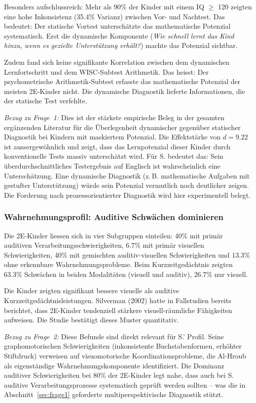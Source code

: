 \documentclass[ngerman, a4paper]{article}
\begin{document}
Besonders aufschlussreich: Mehr als 90\% der Kinder mit einem IQ $\geq$
120 zeigten eine hohe Inkonsistenz (35.4\% Varianz) zwischen Vor- und
Nachtest. Das bedeutet: Der statische Vortest unterschätzte das
mathematische Potenzial systematisch. Erst die dynamische Komponente
(\textit{Wie schnell lernt das Kind hinzu, wenn es gezielte Unterstützung
erhält?}) machte das Potenzial sichtbar.

Zudem fand sich keine signifikante Korrelation zwischen dem dynamischen
Lernfortschritt und dem WISC-Subtest Arithmetik. Das heisst: Der
psychometrische Arithmetik-Subtest erfasste das mathematische Potenzial
der meisten 2E-Kinder nicht. Die dynamische Diagnostik lieferte
Informationen, die der statische Test verfehlte.

\textit{Bezug zu Frage~1:} Dies ist der stärkste empirische Beleg in der
gesamten ergänzenden Literatur für die Überlegenheit dynamischer gegenüber
statischer Diagnostik bei Kindern mit maskiertem Potenzial. Die
Effektstärke von $d = 9.22$ ist aussergewöhnlich und zeigt, dass das
Lernpotenzial dieser Kinder durch konventionelle Tests massiv unterschätzt
wird. Für S. bedeutet das: Sein überdurchschnittliches Testergebnis auf
Englisch ist wahrscheinlich eine Unterschätzung. Eine dynamische
Diagnostik (z.\,B. mathematische Aufgaben mit gestufter Unterstützung)
würde sein Potenzial vermutlich noch deutlicher zeigen. Die Forderung nach
prozessorientierter Diagnostik
\parencite{lemas2023begriffsklaerung,preckel2013hochbegabung} wird hier
experimentell belegt.

\subsubsection*{Wahrnehmungsprofil: Auditive Schwächen dominieren}

Die 2E-Kinder liessen sich in vier Subgruppen einteilen: 40\% mit primär
auditiven Verarbeitungsschwierigkeiten, 6.7\% mit primär visuellen
Schwierigkeiten, 40\% mit gemischten auditiv-visuellen Schwierigkeiten und
13.3\% ohne erkennbare Wahrnehmungsprobleme. Beim Kurzzeitgedächtnis
zeigten 63.3\% Schwächen in beiden Modalitäten (visuell und auditiv),
26.7\% nur visuell.

Die Kinder zeigten signifikant bessere visuelle als auditive
Kurzzeitgedächtnisleistungen. Silverman (2002) hatte in Fallstudien
bereits berichtet, dass 2E-Kinder tendenziell stärkere visuell-räumliche
Fähigkeiten aufweisen. Die Studie bestätigt dieses Muster quantitativ.

\textit{Bezug zu Frage~2:} Diese Befunde sind direkt relevant für S.'
Profil. Seine graphomotorischen Schwierigkeiten (inkonsistente
Buchstabenformen, erhöhter Stiftdruck) verweisen auf visuomotorische
Koordinationsprobleme, die Al-Hroub als eigenständige
Wahrnehmungskomponente identifiziert. Die Dominanz auditiver
Schwierigkeiten bei 80\% der 2E-Kinder legt nahe, dass auch bei S.
auditive Verarbeitungsprozesse systematisch geprüft werden sollten -- was
die in Abschnitt~\ref{sec:frage1} geforderte multiperspektivische
Diagnostik stützt.
\end{document}
